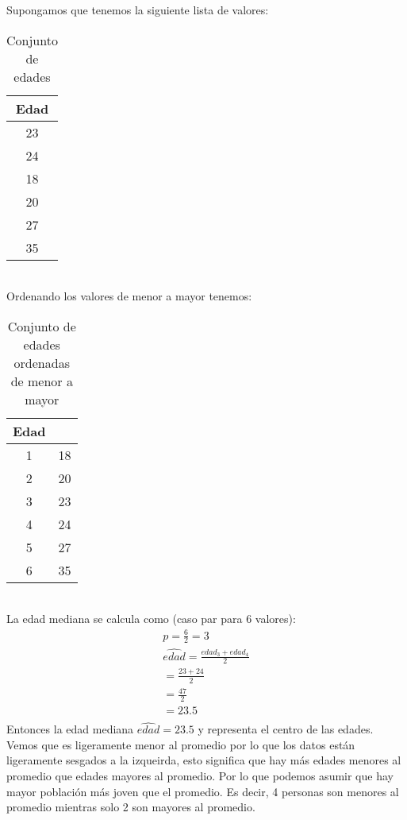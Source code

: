\documentclass{article}
\begin{document}
Supongamos que tenemos la siguiente lista de valores:
\begin{table}[h!]
    \centering
    \begin{tabular}{|c|}
    \hline
    \textbf{Edad} \\ \hline
    23 \\ \hline
    24 \\ \hline
    18 \\ \hline
    20 \\ \hline
    27 \\ \hline
    35 \\ \hline
    \end{tabular}
    \caption{Conjunto de edades}
\end{table}
\\
Ordenando los valores de menor a mayor tenemos:
\begin{table}[h!]
    \centering
    \begin{tabular}{|c|c|}
    \hline
    \textbf{Edad} \\ \hline
    1 & 18 \\ \hline
    2 & 20 \\ \hline
    3 & 23 \\ \hline
    4 & 24 \\ \hline
    5 & 27 \\ \hline
    6 & 35 \\ \hline
    \end{tabular}
    \caption{Conjunto de edades ordenadas de menor a mayor}
\end{table}
\\
La edad mediana se calcula como (caso par para 6 valores):
\begin{equation}
    \begin{aligned}
        p = \frac{6}{2} = 3 \\
        \widehat{edad} = \frac{edad_{3} + edad_{4}}{2} \\
        = \frac{23 + 24}{2} \\
        = \frac{47}{2} \\
        = 23.5 \\
    \end{aligned}
\label{eq:ejemplo_mediana}
\end{equation}
Entonces la edad mediana $\widehat{edad} = 23.5$ y representa el centro de las edades. Vemos que es ligeramente menor al promedio por lo que los datos están ligeramente sesgados a la izqueirda, esto significa que hay más edades menores al promedio que edades mayores al promedio. Por lo que podemos asumir que hay mayor población más joven que el promedio. Es decir, 4 personas son menores al promedio mientras solo 2 son mayores al promedio.
\end{document}
